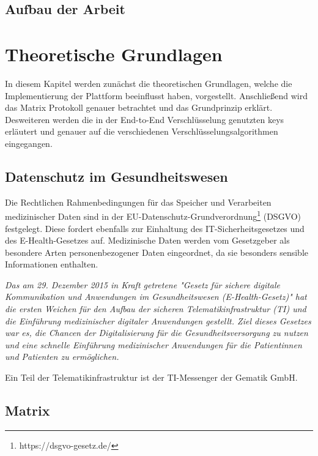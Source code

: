     \section{Aufbau der Arbeit}\label{sec:aufbau-der-arbeit}


    \newpage
    \chapter{Theoretische Grundlagen}\label{ch:theoretische-grundlagen}
    In diesem Kapitel werden zunächst die theoretischen Grundlagen, welche die Implementierung der Plattform beeinflusst haben, vorgestellt.
    Anschließend wird das Matrix Protokoll genauer betrachtet und das Grundprinzip erklärt.
    Desweiteren werden die in der End-to-End Verschlüsselung genutzten keys erläutert und genauer auf die verschiedenen Verschlüsselungsalgorithmen eingegangen.

    \section{Datenschutz im Gesundheitswesen}
    Die Rechtlichen Rahmenbedingungen für das Speicher und Verarbeiten medizinischer Daten sind in der EU-Datenschutz-Grundverordnung\footnote{https://dsgvo-gesetz.de/} (DSGVO) festgelegt.
    Diese fordert ebenfalls zur Einhaltung des IT-Sicherheitsgesetzes und des E-Health-Gesetzes auf.
    Medizinische Daten werden vom Gesetzgeber als besondere Arten personenbezogener Daten eingeordnet, da sie besonders sensible Informationen enthalten.~\cite{datenschutzimgesundeitswesen}

    \textit{Das am 29. Dezember 2015 in Kraft getretene "Gesetz für sichere digitale Kommunikation und Anwendungen im Gesundheitswesen (E-Health-Gesetz)" hat die ersten Weichen für den Aufbau der sicheren Telematikinfrastruktur (TI) und die Einführung medizinischer digitaler Anwendungen gestellt.
    Ziel dieses Gesetzes war es, die Chancen der Digitalisierung für die Gesundheitsversorgung zu nutzen und eine schnelle Einführung medizinischer Anwendungen für die Patientinnen und Patienten zu ermöglichen.}~\cite{ehealthgesetz}

    Ein Teil der Telematikinfrastruktur ist der TI-Messenger der Gematik GmbH.

    \newpage
    \section{Matrix}\label{sec:matrix}

